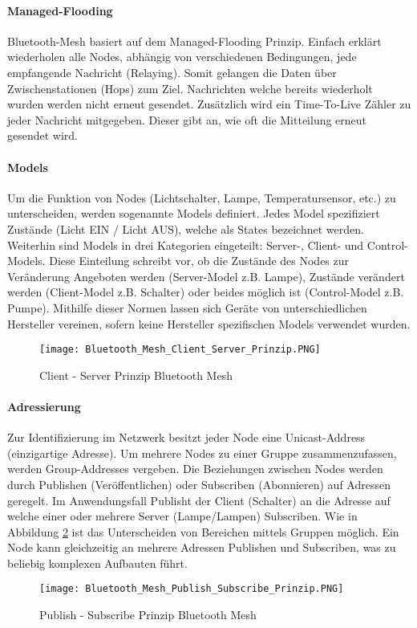 \paragraph{Managed-Flooding}
Bluetooth-Mesh basiert auf dem Managed-Flooding Prinzip. Einfach erklärt wiederholen alle Nodes, abhängig von verschiedenen Bedingungen, jede empfangende Nachricht (Relaying). Somit gelangen die Daten über Zwischenstationen (Hops) zum Ziel. Nachrichten welche bereits  wiederholt wurden werden nicht erneut gesendet. Zusätzlich wird ein Time-To-Live Zähler zu jeder Nachricht mitgegeben. Dieser gibt an, wie oft die Mitteilung erneut gesendet wird.

\paragraph{Models}
Um die Funktion von Nodes (Lichtschalter, Lampe, Temperatursensor, etc.) zu unterscheiden, werden sogenannte Models definiert. Jedes Model spezifiziert Zustände (Licht EIN / Licht AUS), welche als States bezeichnet werden. Weiterhin sind Models in drei Kategorien eingeteilt: Server-, Client- und Control-Models. Diese Einteilung schreibt vor, ob die Zustände des Nodes zur Veränderung Angeboten werden (Server-Model z.B. Lampe), Zustände verändert werden (Client-Model z.B. Schalter) oder beides möglich ist (Control-Model z.B. Pumpe). Mithilfe dieser Normen lassen sich Geräte von unterschiedlichen Hersteller vereinen, sofern keine Hersteller spezifischen Models verwendet wurden. 

\begin{figure} [H]
	\centering
	\texttt{[image: Bluetooth\_Mesh\_Client\_Server\_Prinzip.PNG]}
	\caption{Client - Server Prinzip Bluetooth Mesh \cite{bluetooth_sig_mesh-technology-overviewpdf_2020}} 
	\label{fig:BTMeshClientServerPrinzip}
\end{figure}

\paragraph{Adressierung}
Zur Identifizierung im Netzwerk besitzt jeder Node eine Unicast-Address (einzigartige Adresse). Um mehrere Nodes zu einer Gruppe zusammenzufassen, werden Group-Addresses vergeben. Die Beziehungen zwischen Nodes werden durch Publishen (Veröffentlichen) oder Subscriben (Abonnieren) auf Adressen geregelt. Im Anwendungsfall Publisht der Client (Schalter) an die Adresse auf welche einer oder mehrere Server (Lampe/Lampen) Subscriben. Wie in Abbildung \ref{fig:BTMeshPublishSubscribePrinzip} ist das Unterscheiden von Bereichen mittels Gruppen möglich. Ein Node kann gleichzeitig an mehrere Adressen Publishen und Subscriben, was zu beliebig komplexen Aufbauten führt. 


\begin{figure} [H]
	\centering
	\texttt{[image: Bluetooth\_Mesh\_Publish\_Subscribe\_Prinzip.PNG]}
	\caption{Publish - Subscribe Prinzip Bluetooth Mesh \cite{bluetooth_sig_mesh-technology-overviewpdf_2020}} 
	\label{fig:BTMeshPublishSubscribePrinzip}
\end{figure}








